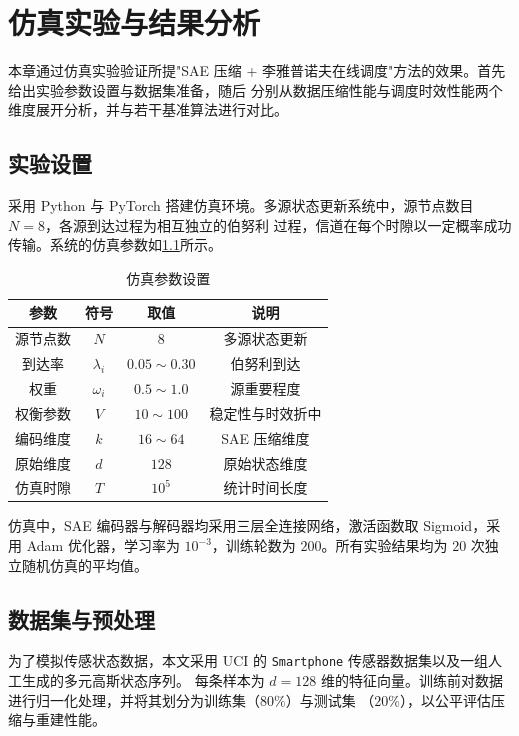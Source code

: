 
\chapter{仿真实验与结果分析}

本章通过仿真实验验证所提"SAE 压缩 + 李雅普诺夫在线调度"方法的效果。首先给出实验参数设置与数据集准备，随后
分别从数据压缩性能与调度时效性能两个维度展开分析，并与若干基准算法进行对比。

\section{实验设置}

采用 Python 与 PyTorch 搭建仿真环境。多源状态更新系统中，源节点数目 $N=8$，各源到达过程为相互独立的伯努利
过程，信道在每个时隙以一定概率成功传输。系统的仿真参数如\cref{tab:params}所示。

\begin{table}[ht!]
  \centering
  \caption{仿真参数设置}\label{tab:params}
  \begin{tabular}{cccc}
    \toprule
    参数 & 符号 & 取值 & 说明 \\
    \midrule
    源节点数 & $N$        & $8$      & 多源状态更新 \\
    到达率   & $\lambda_i$ & $0.05\sim0.30$ & 伯努利到达 \\
    权重     & $\omega_i$  & $0.5\sim1.0$ & 源重要程度 \\
    权衡参数 & $V$        & $10\sim100$ & 稳定性与时效折中 \\
    编码维度 & $k$        & $16\sim64$  & SAE 压缩维度 \\
    原始维度 & $d$        & $128$    & 原始状态维度 \\
    仿真时隙 & $T$        & $10^5$   & 统计时间长度 \\
    \bottomrule
  \end{tabular}
\end{table}

仿真中，SAE 编码器与解码器均采用三层全连接网络，激活函数取 Sigmoid，采用 Adam 优化器，学习率为
$10^{-3}$，训练轮数为 $200$。所有实验结果均为 $20$ 次独立随机仿真的平均值。

\section{数据集与预处理}

为了模拟传感状态数据，本文采用 UCI 的 \texttt{Smartphone} 传感器数据集以及一组人工生成的多元高斯状态序列。
每条样本为 $d=128$ 维的特征向量。训练前对数据进行归一化处理，并将其划分为训练集（$80\%$）与测试集
（$20\%$），以公平评估压缩与重建性能。

